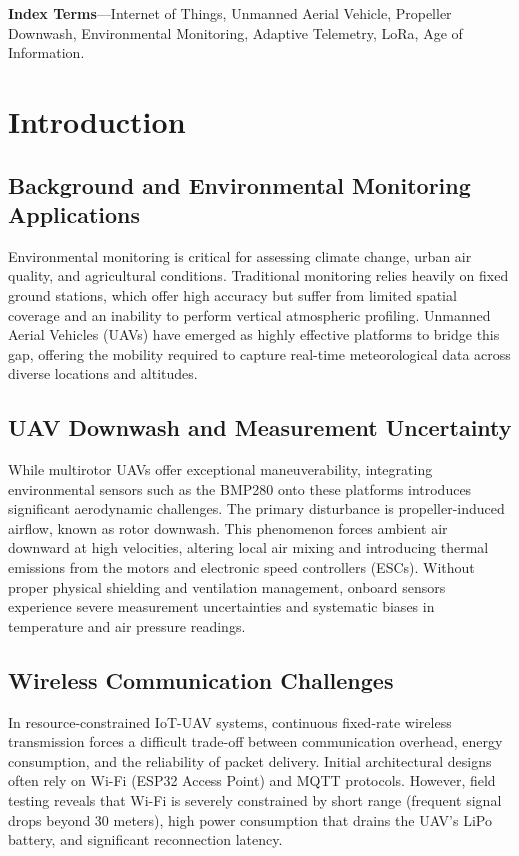 \documentclass[11pt, a4paper]{article}
\begin{document}
\textbf{Index Terms}---Internet of Things, Unmanned Aerial Vehicle, Propeller Downwash, Environmental Monitoring, Adaptive Telemetry, LoRa, Age of Information.

\vspace{1em}

\section{Introduction}
\subsection{Background and Environmental Monitoring Applications}
Environmental monitoring is critical for assessing climate change, urban air quality, and agricultural conditions. Traditional monitoring relies heavily on fixed ground stations, which offer high accuracy but suffer from limited spatial coverage and an inability to perform vertical atmospheric profiling. Unmanned Aerial Vehicles (UAVs) have emerged as highly effective platforms to bridge this gap, offering the mobility required to capture real-time meteorological data across diverse locations and altitudes.

\subsection{UAV Downwash and Measurement Uncertainty}
While multirotor UAVs offer exceptional maneuverability, integrating environmental sensors such as the BMP280 onto these platforms introduces significant aerodynamic challenges. The primary disturbance is propeller-induced airflow, known as rotor downwash. This phenomenon forces ambient air downward at high velocities, altering local air mixing and introducing thermal emissions from the motors and electronic speed controllers (ESCs). Without proper physical shielding and ventilation management, onboard sensors experience severe measurement uncertainties and systematic biases in temperature and air pressure readings.

\subsection{Wireless Communication Challenges}
In resource-constrained IoT-UAV systems, continuous fixed-rate wireless transmission forces a difficult trade-off between communication overhead, energy consumption, and the reliability of packet delivery. Initial architectural designs often rely on Wi-Fi (ESP32 Access Point) and MQTT protocols. However, field testing reveals that Wi-Fi is severely constrained by short range (frequent signal drops beyond 30 meters), high power consumption that drains the UAV's LiPo battery, and significant reconnection latency. 
\end{document}
